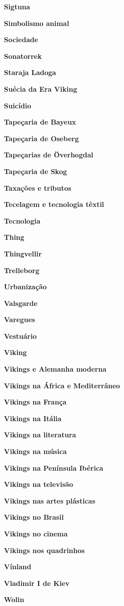 \textbf{Sigtuna}

\textbf{Simbolismo animal}

\textbf{Sociedade}

\textbf{Sonatorrek}

\textbf{Staraja Ladoga}

\textbf{Suécia da Era Viking}

\textbf{Suicídio}

\textbf{Tapeçaria de Bayeux}

\textbf{Tapeçaria de Oseberg}

\textbf{Tapeçarias de Överhogdal}

\textbf{Tapeçaria de Skog}

\textbf{Taxações e tributos}

\textbf{Tecelagem e tecnologia têxtil}

\textbf{Tecnologia}

\textbf{Thing}

\textbf{Thingvellir}

\textbf{Trelleborg}

\textbf{Urbanização}

\textbf{Valsgarde}

\textbf{Varegues}

\textbf{Vestuário}

\textbf{Viking}

\textbf{Vikings e Alemanha moderna}

\textbf{Vikings na África e Mediterrâneo}

\textbf{Vikings na França}

\textbf{Vikings na Itália}

\textbf{Vikings na literatura}

\textbf{Vikings na música}

\textbf{Vikings na Península Ibérica}

\textbf{Vikings na televisão}

\textbf{Vikings nas artes plásticas}

\textbf{Vikings no Brasil}

\textbf{Vikings no cinema}

\textbf{Vikings nos quadrinhos}

\textbf{Vínland}

\textbf{Vladimir I de Kiev}

\textbf{Wolin}
